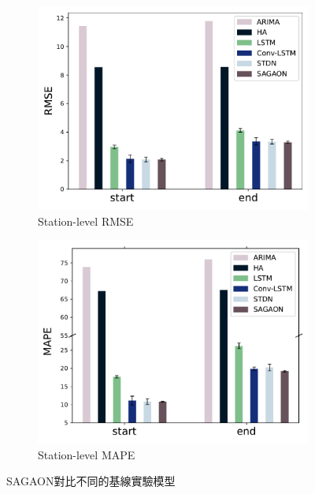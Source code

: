\documentclass[a4paper,14pt]{extarticle}
\begin{document}
                \begin{figure}[htb]
                    \centering
                    \begin{subfigure}{.5\columnwidth}
                        \centering
                        \includegraphics[width=\linewidth]{station_level_RMSE.pdf}
                        \caption{
                            {\fontsize{12pt}{10pt}\selectfont
                                Station-level RMSE
                            }
                        }
                    \end{subfigure}%
                    \hfill
                    \begin{subfigure}{.5\columnwidth}
                        \centering
                        \includegraphics[width=\linewidth]{station_level_MAPE.pdf}
                        \caption{
                            {\fontsize{12pt}{10pt}\selectfont    
                                Station-level MAPE
                            }
                        }
                    \end{subfigure}%
                    \caption{
                        {\fontsize{12pt}{10pt}\selectfont
                            SAGAON對比不同的基線實驗模型
                        }
                    }
                    \label{fig:comparison}
                \end{figure}
\end{document}
